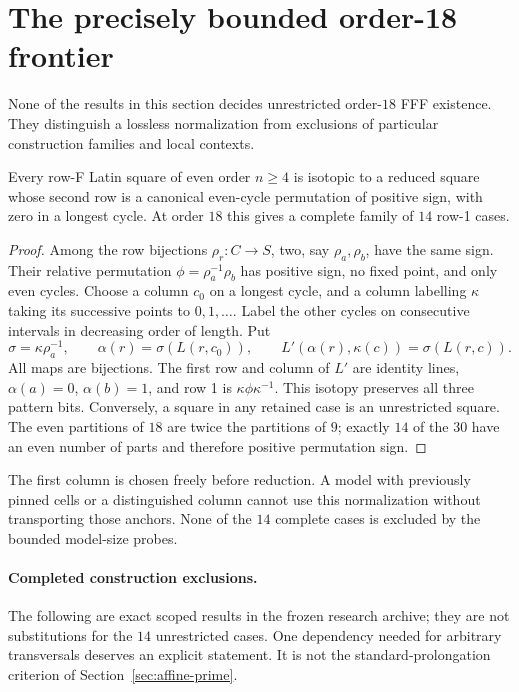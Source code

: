 \section{The precisely bounded order-18 frontier}
\label{sec:order18-scope}

None of the results in this section decides unrestricted order-$18$
FFF existence. They distinguish a lossless normalization from
exclusions of particular construction families and local contexts.

\begin{proposition}
\label{prop:same-sign-normalization}
Every row-F Latin square of even order $n\geq4$ is isotopic to a
reduced square whose second row is a canonical even-cycle
permutation of positive sign, with zero in a longest cycle.
At order $18$ this gives a complete family of $14$ row-1 cases.
\end{proposition}

\begin{proof}
Among the row bijections $\rho_r:C\to S$, two, say $\rho_a,\rho_b$,
have the same sign. Their relative permutation
$\phi=\rho_a^{-1}\rho_b$ has positive sign, no fixed point,
and only even cycles. Choose a column $c_0$ on a longest cycle,
and a column labelling $\kappa$ taking its successive points to
$0,1,\ldots$. Label the other cycles on consecutive intervals
in decreasing order of length. Put
\[
 \sigma=\kappa\rho_a^{-1},\qquad
 \alpha(r)=\sigma(L(r,c_0)),\qquad
 L'(\alpha(r),\kappa(c))=\sigma(L(r,c)).
\]
All maps are bijections. The first row and column of $L'$ are
identity lines, $\alpha(a)=0$, $\alpha(b)=1$, and row 1 is
$\kappa\phi\kappa^{-1}$. This isotopy preserves all three pattern
bits. Conversely, a square in any retained case is an unrestricted
square. The even partitions of $18$ are twice the partitions of
$9$; exactly $14$ of the $30$ have an even number of parts and
therefore positive permutation sign.
\end{proof}

The first column is chosen freely before reduction. A model with
previously pinned cells or a distinguished column cannot use this
normalization without transporting those anchors. None of the
$14$ complete cases is excluded by the bounded model-size probes.

\paragraph{Completed construction exclusions.}
The following are exact scoped results in the frozen research
archive; they are not substitutions for the $14$ unrestricted cases.
One dependency needed for arbitrary transversals deserves an explicit
statement. It is not the standard-prolongation criterion of
Section~\ref{sec:affine-prime}.

